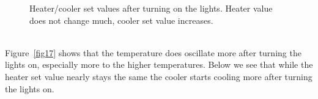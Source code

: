 \documentclass[12pt]{scrartcl}
\begin{document}
      \begin{figure}[h!]
        \hspace{-40pt}
        \hspace{-20pt}
        \caption{Heater/cooler set values after turning on the lights. Heater value
        does not change much, cooler set value increases.}
        \label{fig18}
      \end{figure}\\
      \noindent Figure~\ref{fig17} shows that the temperature does oscillate more after
      turning the lights on, especially more to the higher temperatures.
      Below we see that while the heater set value nearly stays the same the
      cooler starts cooling more after turning the lights on.
      \newpage
\end{document}
